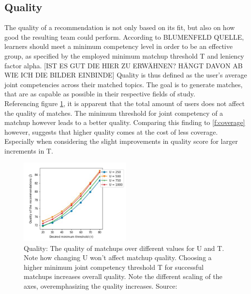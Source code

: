 \documentclass[nochapterpage,bigchapter,linedtoc,longdoc,colorback,accentcolor=tud3b]{tudreport}
\begin{document}
\subsection{Quality} The quality of a recommendation is not only based on its fit, but also on how good the resulting team could perform. According to BLUMENFELD QUELLE, learners should meet a minimum competency level in order to be an effective group, as specified by the employed minimum matchup threshold T and leniency factor alpha. [IST ES GUT DIE HIER ZU ERWÄHNEN? HÄNGT DAVON AB WIE ICH DIE BILDER EINBINDE] Quality is thus defined as the user's average joint competencies across their matched topics. The goal is to generate matches, that are as capable as possible in their respective fields of study.\\
Referencing figure \ref{f:quality}, it is apparent that the total amount of users does not affect the quality of matches. The minimum threshold for joint competency of a matchup however leads to a better quality. Comparing this finding to \ref{f:coverage} however, suggests that higher quality comes at the cost of less coverage. Especially when considering the slight improvements in quality score for larger increments in T.\\
\begin{figure}[p]
	\centering
	\includegraphics[width=0.5\textwidth]{g/QualityByU.PNG}
	\caption{Quality: The quality of matchups over different values for U and T. Note how changing U won't affect matchup quality. Choosing a higher minimum joint competency threshold T for successful matchups increases overall quality. Note the different scaling of the axes, overemphasizing the quality increases. Source: \cite{potts2018reciprocal}}
	\label{f:quality}
\end{figure}
\end{document}
